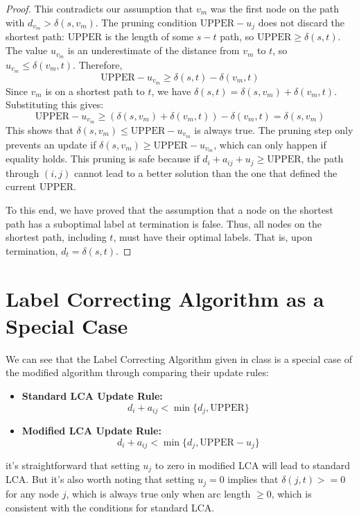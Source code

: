 \documentclass[11pt, a4paper, oneside]{memoir}
\newcommand{\UPPER}{\text{UPPER}}
\begin{document}
\begin{proof}
  This contradicts our assumption that $v_m$ was the first node on the path with $d_{v_m} > \delta(s, v_m)$.
  The pruning condition $\UPPER - u_j$ does not discard the shortest path: $\UPPER$ is the length of some $s-t$ path, so $\UPPER \ge \delta(s, t)$. The value $u_{v_m}$ is an underestimate of the distance from $v_m$ to $t$, so $u_{v_m} \le \delta(v_m, t)$.
  Therefore,
  \[ \UPPER - u_{v_m} \ge \delta(s, t) - \delta(v_m, t) \]
  Since $v_m$ is on a shortest path to $t$, we have $\delta(s, t) = \delta(s, v_m) + \delta(v_m, t)$. Substituting this gives:
  \[ \UPPER - u_{v_m} \ge (\delta(s, v_m) + \delta(v_m, t)) - \delta(v_m, t) = \delta(s, v_m) \]
  This shows that $\delta(s, v_m) \le \UPPER - u_{v_m}$ is always true.
  The pruning step only prevents an update if $\delta(s, v_m) \ge \UPPER - u_{v_m}$, which can only happen if equality holds.
  This pruning is safe because if $d_i + a_{ij} + u_j \ge \UPPER$,
  the path through $(i,j)$ cannot lead to a better solution than the one that defined the current $\UPPER$.

  To this end, we have proved that the assumption that a node on the shortest path has a suboptimal label at termination is false.
  Thus, all nodes on the shortest path, including $t$, must have their optimal labels.
  That is, upon termination, $d_t = \delta(s, t)$.
\end{proof}

\newpage
\section{Label Correcting Algorithm as a Special Case}
We can see that the Label Correcting Algorithm given in class is a special case of the modified algorithm
through comparing their update rules:
\begin{itemize}
  \item \textbf{Standard LCA Update Rule:}
        \[ d_i + a_{ij} < \min\{d_j, \UPPER\} \]
  \item \textbf{Modified LCA Update Rule:}
        \[ d_i + a_{ij} < \min\{d_j, \UPPER - u_j\} \]
\end{itemize}
it's straightforward that setting $u_j$ to zero in modified LCA will lead to standard LCA.
But it's also worth noting that setting $u_j=0$ implies that $\delta(j,t)>=0$ for any node $j$,
which is always true only when arc length $\geq 0$, which is consistent with the conditions for standard LCA.
\end{document}
